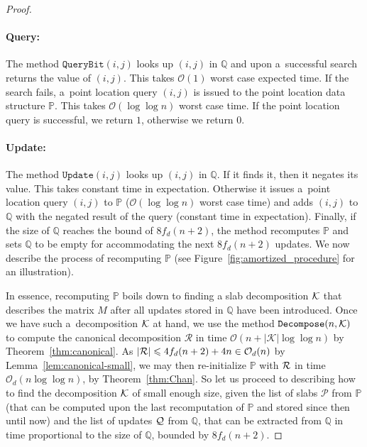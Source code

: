 \documentclass[runningheads]{llncs}
\newcommand{\Oh}{\mathcal{O}}
\renewcommand{\leq}{\leqslant}
\begin{document}
\begin{proof}
\paragraph*{Query:}
The method $\mathtt{QueryBit}(i,j)$ looks up $(i,j)$ in $\mathbb{Q}$
and upon a~successful search returns the value of $(i,j)$.
This takes $\Oh(1)$ worst case expected time.
If the search fails, a~point location query $(i,j)$ is issued to
the point location data structure $\mathbb{P}$. This takes
$\Oh(\log \log n)$ worst case time. If the point location
query is successful, we return $1$, otherwise we return $0$.

\paragraph*{Update:}
The method $\mathtt{Update}(i, j)$ looks up $(i,j)$ in
$\mathbb{Q}$. If it finds it, then it negates its value.
This takes constant time in expectation.
Otherwise it issues a~point location query $(i,j)$ to $\mathbb{P}$
($\Oh(\log \log n)$ worst case time)
and adds $(i,j)$ to $\mathbb{Q}$ with the negated result of the query
(constant time in expectation).
Finally,
if the size of $\mathbb{Q}$ reaches the bound of $8 f_d(n+2)$,
the method
recomputes $\mathbb{P}$ and sets $\mathbb{Q}$ to be empty for
accommodating the next $8 f_d(n+2)$ updates.
We now describe the process of recomputing $\mathbb{P}$ (see Figure~\ref{fig:amortized_procedure} for an illustration).

In essence, recomputing $\mathbb{P}$ boils down to finding
a slab decomposition $\cal K$ that describes the
matrix $M$ after all updates stored in $\mathbb{Q}$ have been
introduced. Once we have such a~decomposition $\cal K$ at hand,
we use the method $\mathtt{Decompose}(n,\cal K)$ to compute
the canonical decomposition $\mathcal{R}$ in time
$\Oh(n+|\mathcal{K}| \log \log n)$ by
Theorem~\ref{thm:canonical}. As $|{\cal R}|\leq 4 f_d(n+2)+4n \in \Oh_d(n)$ by Lemma~\ref{lem:canonical-small}, we may then re-initialize $\mathbb{P}$ with ${\cal R}$
in time $\Oh_d(n \log \log n)$, by Theorem~\ref{thm:Chan}.
So let us proceed to describing how to find the decomposition
$\cal K$ of small enough size, given the list of slabs $\mathcal{P}$
from $\mathbb{P}$ (that can be computed upon the last recomputation
of
$\mathbb{P}$ and stored since then until now) and the list of
updates $\cal Q$ from $\mathbb{Q}$, that can be extracted from
$\mathbb{Q}$ in time proportional to the size of $\mathbb{Q}$,
bounded by $8 f_d(n+2)$.


\end{proof}
\end{document}
